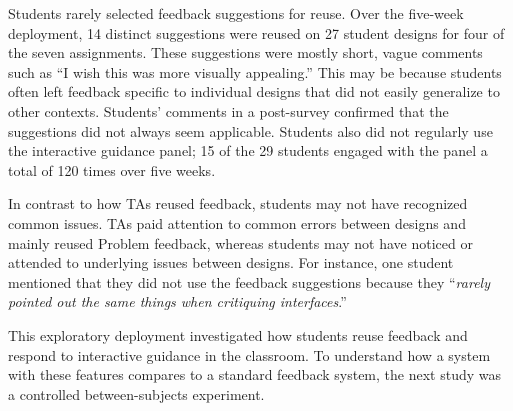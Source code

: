 Students rarely selected feedback suggestions for reuse. Over the five-week deployment, 14 distinct suggestions were reused on 27 student designs for four of the seven assignments. These suggestions were mostly short, vague comments such as ``I wish this was more visually appealing.'' This may be because students often left feedback specific to individual designs that did not easily generalize to other contexts. Students' comments in a post-survey confirmed that the suggestions did not always seem applicable. Students also did not regularly use the interactive guidance panel; 15 of the 29 students engaged with the panel a total of 120 times over five weeks. 

In contrast to how TAs reused feedback, students may not have recognized common issues. TAs paid attention to common errors between designs and mainly reused Problem feedback, whereas students may not have noticed or attended to underlying issues between designs. For instance, one student mentioned that they did not use the feedback suggestions because they ``\textit{rarely pointed out the same things when critiquing interfaces}.'' 

This exploratory deployment investigated how students reuse feedback and respond to interactive guidance in the classroom. To understand how a system with these features compares to a standard feedback system, the next study was a controlled between-subjects experiment. 
